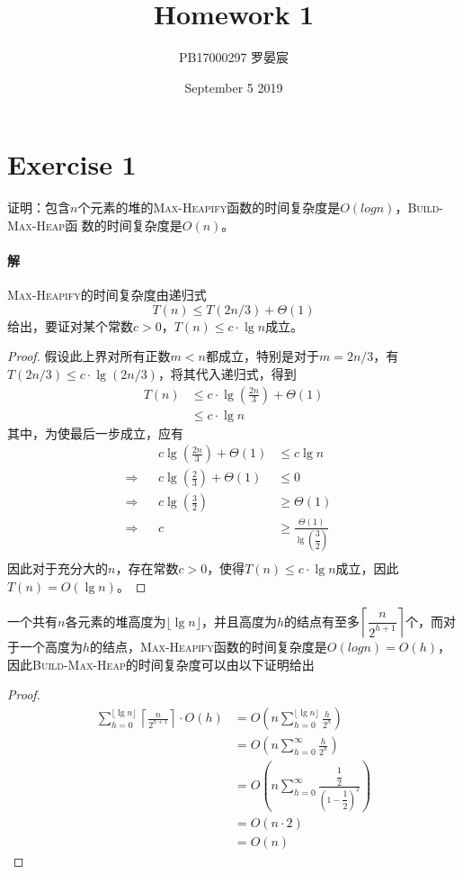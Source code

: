 \documentclass{article}
\title{Homework 1}
\author{PB17000297 罗晏宸}
\date{September 5 2019}
\begin{document}
\maketitle

\section{Exercise 1}
证明：包含$n$个元素的堆的\textsc{Max-Heapify}函数的时间复杂度是$O(logn)$，\textsc{Build-Max-Heap}函
数的时间复杂度是$O(n)$。
\\

\paragraph{解}
\textsc{Max-Heapify}的时间复杂度由递归式
\begin{equation*}
    T(n) \leq T(2n/3) + \Theta(1)
\end{equation*}
给出，要证对某个常数$c > 0$，$T(n) \leq c \cdot \lg{n}$成立。
\begin{proof}
假设此上界对所有正数$m < n$都成立，特别是对于$m =  2n/3$，有$T( 2n/3 ) \leq c \cdot \lg{(2n/3)}$，将其代入递归式，得到
\begin{align*}
    T(n) &\leq c \cdot \lg{\left(\frac{2n}{3}\right)} + \Theta(1) \\
    &\leq c \cdot \lg{n} 
\end{align*}
其中，为使最后一步成立，应有
\begin{align*}
    && c \lg{\left(\frac{2n}{3}\right)} + \Theta(1) &\leq c \lg{n}& \\
    \Rightarrow && c \lg{\left( \frac{2}{3} \right)} + \Theta(1) &\leq 0 & \\
    \Rightarrow && c \lg{\left( \frac{3}{2} \right)} &\geq \Theta(1) & \\
    \Rightarrow && c &\geq \frac{\Theta(1)}{\lg{\left( \dfrac{3}{2} \right)}}& \\
\end{align*}
因此对于充分大的$n$，存在常数$c > 0$，使得$T(n) \leq c \cdot \lg{n}$成立，因此$T(n) = O(\lg{n})$。
\end{proof}
一个共有$n$各元素的堆高度为$\lfloor \lg{n} \rfloor$，并且高度为$h$的结点有至多$\left\lceil \dfrac{n}{2^{h+1}} \right\rceil$个，而对于一个高度为$h$的结点，\textsc{Max-Heapify}函数的时间复杂度是$O(logn)=O(h)$，因此\textsc{Build-Max-Heap}的时间复杂度可以由以下证明给出
\begin{proof}
\begin{align*}
    \sum_{h=0}^{\lfloor \lg{n} \rfloor}{\left\lceil \frac{n}{2^{h+1}} \right\rceil \cdot O(h)} &= O\left( n\sum_{h=0}^{\lfloor \lg{n} \rfloor}{\frac{h}{2^h}} \right) \\
    &= O\left( n\sum_{h=0}^{\infty}{\frac{h}{2^h}} \right) \\
    &= O\left( n\sum_{h=0}^{\infty}{\frac{\dfrac{1}{2}}{\left( 1 - \dfrac{1}{2} \right)^2}} \right) \\
    &= O(n \cdot 2) \\
    &= O(n)
\end{align*}
\end{proof}
\\
\end{document}
